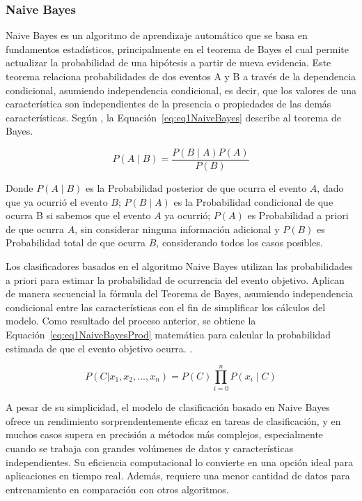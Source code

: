 \documentclass[11pt,a4paper,spanish]{book}
\numberwithin{equation}{chapter}
\numberwithin{figure}{chapter}
\begin{document}
\subsubsection{Naive Bayes}

Naive Bayes es un algoritmo de aprendizaje automático que se basa en fundamentos 
estadísticos, principalmente en el teorema de Bayes el cual permite actualizar la 
probabilidad de una hipótesis a partir de nueva evidencia. Este teorema relaciona 
probabilidades de dos eventos A y B a través de la dependencia condicional, asumiendo 
independencia condicional, es decir, que los valores de una característica son 
independientes de la presencia o propiedades de las demás características. Según 
\cite{han2012datamining}, la Equación~\ref{eq:eq1NaiveBayes} describe al teorema de 
Bayes.


\begin{equation}\label{eq:eq1NaiveBayes}
P(A \mid B) = \frac{P(B \mid A) P(A)}{P(B)}
\end{equation}


Donde $P(A \mid B)$ es la Probabilidad posterior de que ocurra el evento $A$, dado que 
ya ocurrió el evento $B$; $P(B \mid A)$ es la Probabilidad condicional de que ocurra B 
si sabemos que el evento $A$ ya ocurrió; $P(A)$ es Probabilidad a priori de que ocurra 
$A$, sin considerar ninguna información adicional y $P(B)$ es Probabilidad total de que 
ocurra $B$, considerando todos los casos posibles.


Los clasificadores basados en el algoritmo Naive Bayes utilizan las probabilidades a 
priori para estimar la probabilidad de ocurrencia del evento objetivo. Aplican de 
manera secuencial la fórmula del Teorema de Bayes, asumiendo independencia condicional 
entre las características con el fin de simplificar los cálculos del modelo. 
Como resultado del proceso anterior, se obtiene la Equación~\ref{eq:eq1NaiveBayesProd} 
matemática para calcular la probabilidad estimada de que el evento objetivo ocurra. 
\cite{salman2024rf}. 


\begin{equation}\label{eq:eq1NaiveBayesProd}
P(C|x_1, x_2, ..., x_n) = P(C) \prod_{i = 0}^{n} P(x_i \mid C)
\end{equation}


A pesar de su simplicidad, el modelo de clasificación basado en Naive Bayes ofrece un 
rendimiento sorprendentemente eficaz en tareas de clasificación, y en muchos casos 
supera en precisión a métodos más complejos, especialmente cuando se trabaja con 
grandes volúmenes de datos y características independientes. Su eficiencia computacional 
lo convierte en una opción ideal para aplicaciones en tiempo real. Además, requiere una 
menor cantidad de datos para entrenamiento en comparación con otros algoritmos.
\end{document}

